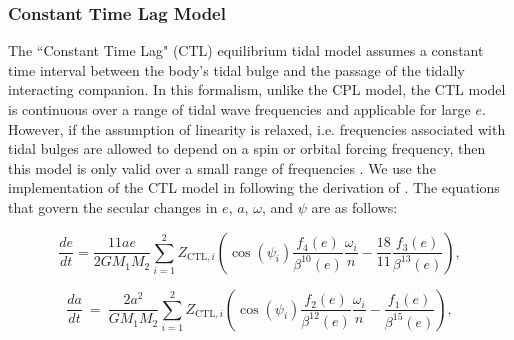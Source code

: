 \subsubsection{Constant Time Lag Model}

The ``Constant Time Lag" (CTL) \citep[][]{Hut1981,Leconte2010} equilibrium tidal model assumes a constant time interval between the body's tidal bulge and the passage of the tidally interacting companion. In this formalism, unlike the CPL model, the CTL model is continuous over a range of tidal wave frequencies and applicable for large $e$.  However, if the assumption of linearity is relaxed, i.e. frequencies associated with tidal bulges are allowed to depend on a spin or orbital forcing frequency, then this model is only valid over a small range of frequencies \citep{Greenberg2009}. We use the \eqtide implementation of the CTL model in \vplanet following the derivation of \citet{Leconte2010}.  The equations that govern the secular changes in $e$, $a$, $\omega$, and $\psi$ are as follows:

\begin{equation} \label{sync:eqn:ctl:e}
  \frac{de}{dt} = \frac{11 ae}{2 G M_1 M_2}
  \sum_{i = 1}^2 Z_{\mathrm{CTL},i} \left( \cos(\psi_i) \frac{f_4(e)}{\beta^{10}(e)}  \frac{\omega_i}{n} -\frac{18}{11} \frac{f_3(e)}{\beta^{13}(e)}\right),
\end{equation}

\small
\begin{equation}\label{sync:eqn:ctl:a}
  \frac{da}{dt} \ = \  \frac{2 a^2}{G M_1 M_2}
  \sum\limits_{i = 1}^2 Z_{\mathrm{CTL},i} \left( \cos(\psi_i) \frac{f_2(e)}{\beta^{12}(e)} \frac{\omega_i}{n} - \frac{f_1(e)}{\beta^{15}(e)}\right),
\end{equation}

